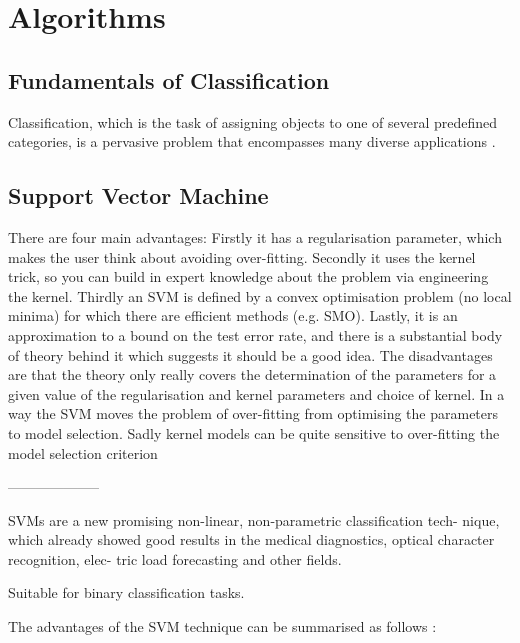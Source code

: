 
\chapter{Algorithms}
\label{ch:algorithms}

\section{Fundamentals of Classification}

Classification, which is the task of assigning objects to one of several predefined categories, is a pervasive problem that encompasses many diverse applications \cite{pang2006introduction}.

\section{Support Vector Machine}

There are four main advantages: Firstly it has a regularisation parameter, which makes the user think about avoiding over-fitting. Secondly it uses the kernel trick, so you can build in expert knowledge about the problem via engineering the kernel. Thirdly an SVM is defined by a convex optimisation problem (no local minima) for which there are efficient methods (e.g. SMO). Lastly, it is an approximation to a bound on the test error rate, and there is a substantial body of theory behind it which suggests it should be a good idea.
The disadvantages are that the theory only really covers the determination of the parameters for a given value of the regularisation and kernel parameters and choice of kernel. In a way the SVM moves the problem of over-fitting from optimising the parameters to model selection. Sadly kernel models can be quite sensitive to over-fitting the model selection criterion \cite{cawley2010over}

--------------------

SVMs are a new promising non-linear, non-parametric classification tech- nique, which already showed good results in the medical diagnostics, optical character recognition, elec- tric load forecasting and other fields.

Suitable for binary classification tasks.

The advantages of the SVM technique can be summarised as follows \cite{auria2008support}:

